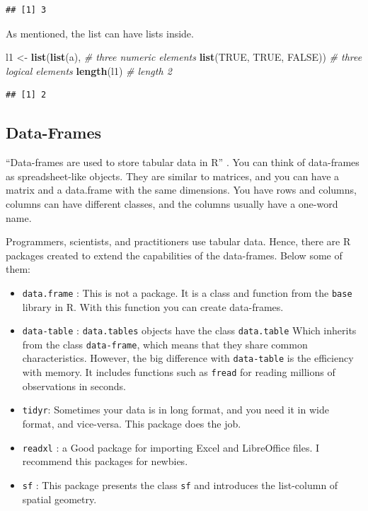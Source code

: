 \documentclass[12pt,graybox,envcountchap,sectrefs]{krantz}
\makeatletter
\newenvironment{Shaded}{\begin{snugshade}}{\end{snugshade}}
\newcommand{\KeywordTok}[1]{\textcolor[rgb]{0.13,0.29,0.53}{\textbf{#1}}}
\newcommand{\StringTok}[1]{\textcolor[rgb]{0.31,0.60,0.02}{#1}}
\newcommand{\CommentTok}[1]{\textcolor[rgb]{0.56,0.35,0.01}{\textit{#1}}}
\newcommand{\OtherTok}[1]{\textcolor[rgb]{0.56,0.35,0.01}{#1}}
\newcommand{\NormalTok}[1]{#1}
\providecommand{\tightlist}{%
  \setlength{\itemsep}{0pt}\setlength{\parskip}{0pt}}
\newenvironment{kframe}{%
\medskip{}
\setlength{\fboxsep}{.8em}
 \def\at@end@of@kframe{}%
 \ifinner\ifhmode%
  \def\at@end@of@kframe{\end{minipage}}%
  \begin{minipage}{\columnwidth}%
 \fi\fi%
 \def\FrameCommand##1{\hskip\@totalleftmargin \hskip-\fboxsep
 \colorbox{shadecolor}{##1}\hskip-\fboxsep
     \hskip-\linewidth \hskip-\@totalleftmargin \hskip\columnwidth}%
 \MakeFramed {\advance\hsize-\width
   \@totalleftmargin\z@ \linewidth\hsize
   \@setminipage}}%
 {\par\unskip\endMakeFramed%
 \at@end@of@kframe}
\renewenvironment{Shaded}{\begin{kframe}}{\end{kframe}}
\theoremstyle{definition}
\theoremstyle{definition}
\theoremstyle{definition}
\theoremstyle{remark}
\makeatother
\begin{document}
\begin{verbatim}
## [1] 3
\end{verbatim}

As mentioned, the list can have lists inside.

\begin{Shaded}
\begin{Highlighting}[]
\NormalTok{l1 <-}\StringTok{ }\KeywordTok{list}\NormalTok{(}\KeywordTok{list}\NormalTok{(a),                    }\CommentTok{# three numeric elements}
            \KeywordTok{list}\NormalTok{(}\OtherTok{TRUE}\NormalTok{, }\OtherTok{TRUE}\NormalTok{, }\OtherTok{FALSE}\NormalTok{))   }\CommentTok{# three logical elements}
\KeywordTok{length}\NormalTok{(l1)                             }\CommentTok{# length 2}
\end{Highlighting}
\end{Shaded}

\begin{verbatim}
## [1] 2
\end{verbatim}

\subsection{Data-Frames}\label{data-frames}

``Data-frames are used to store tabular data in R'' \citep{peng2015r}.
You can think of data-frames as spreadsheet-like objects. They are
similar to matrices, and you can have a matrix and a data.frame with the
same dimensions. You have rows and columns, columns can have different
classes, and the columns usually have a one-word name.

Programmers, scientists, and practitioners use tabular data. Hence,
there are R packages created to extend the capabilities of the
data-frames. Below some of them:

\begin{itemize}
\tightlist
\item
  \texttt{data.frame} : This is not a package. It is a class and
  function from the \texttt{base} library in R. With this function you
  can create data-frames.
\item
  \texttt{data-table} \citep{datatable}: \texttt{data.tables} objects
  have the class \texttt{data.table} Which inherits from the class
  \texttt{data-frame}, which means that they share common
  characteristics. However, the big difference with \texttt{data-table}
  is the efficiency with memory. It includes functions such as
  \texttt{fread} for reading millions of observations in seconds.
\item
  \texttt{tidyr}\citep{tidyr}: Sometimes your data is in long format,
  and you need it in wide format, and vice-versa. This package does the
  job.
\item
  \texttt{readxl} \citep{readxl}: a Good package for importing Excel and
  LibreOffice files. I recommend this packages for newbies.
\item
  \texttt{sf} \citep{sf}: This package presents the class \texttt{sf}
  and introduces the list-column of spatial geometry.
\end{itemize}
\end{document}
